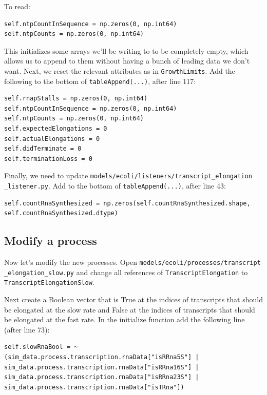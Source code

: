 \documentclass[12pt]{article}
\begin{document}
To read:
\lstset{language=Python}
\begin{lstlisting}
self.ntpCountInSequence = np.zeros(0, np.int64)
self.ntpCounts = np.zeros(0, np.int64)
\end{lstlisting}

This initializes some arrays we'll be writing to to be completely empty, which allows us to append to them without having a bunch of leading data we don't want. Next, we reset the relevant attributes as in \texttt{GrowthLimits}. Add the following to the bottom of \texttt{tableAppend(...)}, after line 117:
\lstset{language=Python}
\begin{lstlisting}
self.rnapStalls = np.zeros(0, np.int64)
self.ntpCountInSequence = np.zeros(0, np.int64)
self.ntpCounts = np.zeros(0, np.int64)
self.expectedElongations = 0
self.actualElongations = 0
self.didTerminate = 0
self.terminationLoss = 0
\end{lstlisting}

Finally, we need to update \texttt{models/ecoli/listeners/transcript\_elongation \allowbreak \_listener.py}. Add to the bottom of \texttt{tableAppend(...)}, after line 43:
\lstset{language=Python}
\begin{lstlisting}
self.countRnaSynthesized = np.zeros(self.countRnaSynthesized.shape, self.countRnaSynthesized.dtype)
\end{lstlisting}

\subsection{Modify a process}

Now let's modify the new processes. Open \texttt{models/ecoli/processes/transcript \allowbreak \_elongation\_slow.py} and change all references of \texttt{TranscriptElongation} to \texttt{TranscriptElongationSlow}.

Next create a Boolean vector that is True at the indices of transcripts that should be elongated at the slow rate and False at the indices of transcripts that should be elongated at the fast rate. In the initialize function add the following line (after line 73):

\lstset{language=Python}
\begin{lstlisting}
self.slowRnaBool = ~(sim_data.process.transcription.rnaData["isRRna5S"] | sim_data.process.transcription.rnaData["isRRna16S"] | sim_data.process.transcription.rnaData["isRRna23S"] | sim_data.process.transcription.rnaData["isTRna"])
\end{lstlisting}
\end{document}
